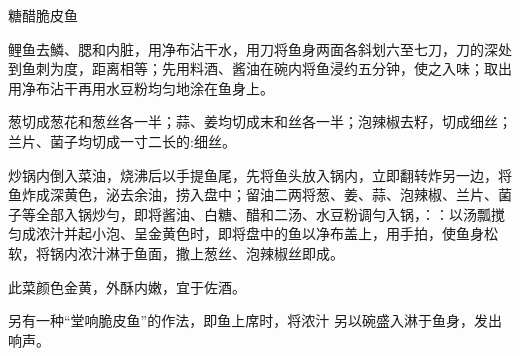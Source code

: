 \begin{recipe}{糖醋脆皮鱼}

\ingredients



\cooking

\step 鲤鱼去鱗、腮和内脏，用净布沾干水，用刀将鱼身两面各斜划六至七刀，刀的深处到鱼刺为度，距离相等；先用料酒、酱油在碗内将鱼浸约五分钟，使之入味；取出用净布沾干再用水豆粉均匀地涂在鱼身上。

\step 葱切成葱花和葱丝各一半；蒜、姜均切成末和丝各一半；泡辣椒去籽，切成细丝；兰片、菌子均切成一寸二长的:细丝。

\step 炒锅内倒入菜油，烧沸后以手提鱼尾，先将鱼头放入锅内，立即翻转炸另一边，将鱼炸成深黄色，泌去余油，捞入盘中；留油二两将葱、姜、蒜、泡辣椒、兰片、菌子等全部入锅炒勻，即将酱油、白糖、醋和二汤、水豆粉调勻入锅，：：以汤瓢搅匀成浓汁并起小泡、呈金黄色时，即将盘中的鱼以净布盖上，用手拍，使鱼身松软，将锅内浓汁淋于鱼面，撒上葱丝、泡辣椒丝即成。

\notes

此菜颜色金黄，外酥内嫩，宜于佐酒。

另有一种“堂响脆皮鱼”的作法，即鱼上席时，将浓汁 另以碗盛入淋于鱼身，发出响声。

\end{recipe}

